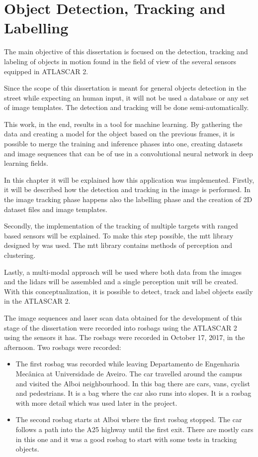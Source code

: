\chapter{Object Detection, Tracking and Labelling}

The main objective of this dissertation is focused on the detection, tracking and labeling of objects in motion found in the field of view of the several sensors equipped in ATLASCAR 2. 

Since the scope of this dissertation is meant for general objects detection in the street while expecting an human input, it will not be used a database or any set of image templates. The detection and tracking will be done semi-automatically. 

This work, in the end, results in a tool for machine learning. By gathering the data and creating a model for the object based on the previous frames, it is possible to merge the training and inference phases into one, creating datasets and image sequences that can be of use in a convolutional neural network in deep learning fields.

In this chapter it will be explained how this application was implemented. Firstly, it will be described how the detection and tracking in the image is performed. In the image tracking phase happens also the labelling phase and the creation of 2D dataset files and image templates. 

Secondly, the implementation of the tracking of multiple targets with ranged based sensors will be explained. To make this step possible, the \gls{mtt} library designed by \cite{SoaresDeAlmeida2016a} was used. The \gls{mtt} library contains methods of perception and clustering. 

Lastly, a multi-modal approach will be used where both data from the images and the \gls{lidar}s will be assembled and a single perception unit will be created. With this conceptualization, it is possible to detect, track and label objects easily in the ATLASCAR 2.

The image sequences and laser scan data obtained for the development of this stage of the dissertation were recorded into rosbags using the ATLASCAR 2 using the sensors it has. The rosbags were recorded in October 17, 2017, in the afternoon. Two rosbags were recorded:

\begin{itemize}
	\item The first rosbag was recorded while leaving Departamento de Engenharia Mec\^anica at Universidade de Aveiro. The car travelled around the campus and visited the Alboi neighbourhood.
	\subitem In this bag there are cars, vans, cyclist and pedestrians. It is a bag where the car also runs into slopes. It is a rosbag with more detail which was used later in the project.
	\item The second rosbag starts at Alboi where the first rosbag stopped. The car follows a path into the A25 highway until the first exit.
	\subitem There are mostly cars in this one and it was a good rosbag to start with some tests in tracking objects.
\end{itemize} 

